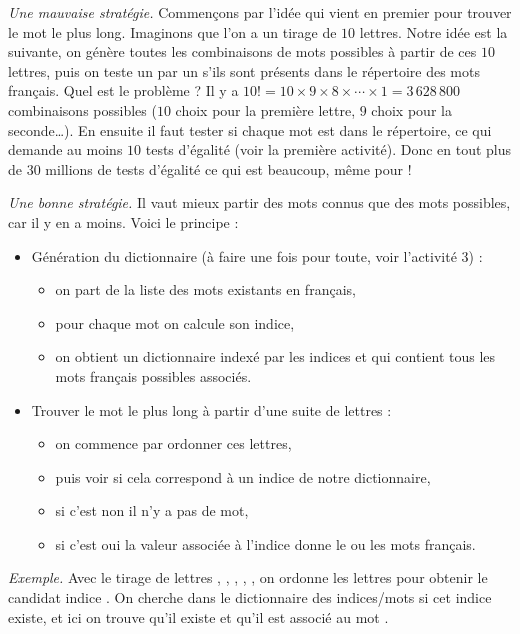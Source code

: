 \documentclass[11pt,class=report,crop=false]{standalone}
\begin{document}
\begin{cours}
 
\emph{Une mauvaise stratégie.} Commençons par l'idée qui vient en premier pour trouver le mot le plus long. 
Imaginons que l'on a un tirage de $10$ lettres. Notre idée est la suivante, on génère toutes les combinaisons de mots possibles à partir de ces $10$ lettres, puis on teste un par un s'ils sont présents dans le répertoire des mots français.
Quel est le problème ? Il y a $10! = 10 \times 9 \times 8 \times \cdots \times 1 = 3\,628\,800$ combinaisons possibles ($10$ choix pour la première lettre, $9$ choix pour la seconde\ldots). En ensuite il faut tester si chaque mot est dans le répertoire, ce qui demande au moins $10$ tests d'égalité (voir la première activité). Donc en tout plus de $30$ millions de tests d'égalité ce qui est beaucoup, même pour \Python{} ! 

\medskip

\emph{Une bonne stratégie.} Il vaut mieux partir des mots connus que des mots possibles, car il y en a moins.
Voici le principe :
\begin{itemize}
  \item Génération du dictionnaire (à faire une fois pour toute, voir l'activité 3) :
  \begin{itemize}
    \item on part de la liste des mots existants en français,
    \item pour chaque mot on calcule son indice,
    \item on obtient un dictionnaire indexé par les indices et qui contient tous les mots français possibles associés.
  \end{itemize}
  \item Trouver le mot le plus long à partir d'une suite de lettres :
  \begin{itemize}
    \item on commence par ordonner ces lettres,
    \item puis voir si cela correspond à un indice de notre dictionnaire, 
    \item si c'est non il n'y a pas de mot, 
    \item si c'est oui la valeur associée à l'indice donne le ou les mots français.
  \end{itemize}
\end{itemize}

\bigskip

\emph{Exemple.}
Avec le tirage de lettres , , , , , on ordonne les lettres pour obtenir le candidat indice . On cherche dans le dictionnaire des indices/mots si cet indice existe, et ici on trouve qu'il existe et qu'il est associé au mot .
\bigskip


\end{cours}
\end{document}
